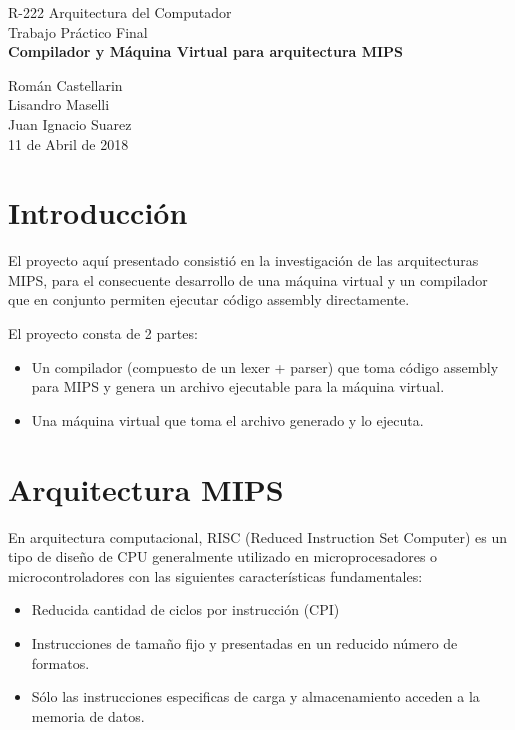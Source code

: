 \documentclass[12pt]{article}
\begin{document}
\begin{titlepage}
\vspace{0.5cm}

\begin{center}
\normalsize{\sc R-222 Arquitectura del Computador}\\
\vspace{0.5cm}
\large{Trabajo Práctico Final}\\

\Large{\bf Compilador y Máquina Virtual para arquitectura MIPS}\\
\vspace{5cm}

\normalsize
 Román Castellarin\\
Lisandro Maselli\\
Juan Ignacio Suarez\\

\vspace*{0.5cm}
\small{11 de Abril de 2018}


\end{center}
\end{titlepage}
\newpage
\section{Introducción}
El proyecto aquí presentado consistió en la investigación de las arquitecturas MIPS, para el consecuente desarrollo de una máquina virtual y un compilador que en conjunto permiten ejecutar código assembly directamente.

El proyecto consta de 2 partes:
\begin{itemize}
\item Un compilador (compuesto de un lexer + parser) que toma código assembly para MIPS y genera un archivo ejecutable para la máquina virtual.
\item Una máquina virtual que toma el archivo generado y lo ejecuta.
\end{itemize}    

\section{Arquitectura MIPS}
En arquitectura computacional, RISC (Reduced Instruction Set Computer) es un tipo de diseño de CPU generalmente utilizado en microprocesadores
o microcontroladores con las siguientes características fundamentales:
\begin{itemize}
\item Reducida cantidad de ciclos por instrucción (CPI)
\item Instrucciones de tamaño fijo y presentadas en un reducido número de formatos.
\item Sólo las instrucciones especificas de carga y almacenamiento acceden a la memoria de datos.
\end{itemize}
\end{document}
